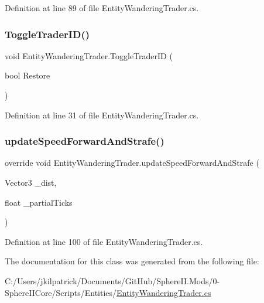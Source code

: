 Definition at line 89 of file Entity\+Wandering\+Trader.\+cs.

\mbox{\label{class_entity_wandering_trader_a69dd924900c7fbd29d0d8d60eb3fef84}} 
\subsubsection{\texorpdfstring{ToggleTraderID()}{ToggleTraderID()}}
{\footnotesize\ttfamily void Entity\+Wandering\+Trader.\+Toggle\+Trader\+ID (\begin{DoxyParamCaption}\item[{bool}]{Restore }\end{DoxyParamCaption})}



Definition at line 31 of file Entity\+Wandering\+Trader.\+cs.

\mbox{\label{class_entity_wandering_trader_a52a62140eb8466285b6305988c51066e}} 
\subsubsection{\texorpdfstring{updateSpeedForwardAndStrafe()}{updateSpeedForwardAndStrafe()}}
{\footnotesize\ttfamily override void Entity\+Wandering\+Trader.\+update\+Speed\+Forward\+And\+Strafe (\begin{DoxyParamCaption}\item[{Vector3}]{\+\_\+dist,  }\item[{float}]{\+\_\+partial\+Ticks }\end{DoxyParamCaption})\hspace{0.3cm}{\ttfamily [protected]}}



Definition at line 100 of file Entity\+Wandering\+Trader.\+cs.



The documentation for this class was generated from the following file\+:\begin{DoxyCompactItemize}
\item 
C\+:/\+Users/jkilpatrick/\+Documents/\+Git\+Hub/\+Sphere\+I\+I.\+Mods/0-\/\+Sphere\+I\+I\+Core/\+Scripts/\+Entities/\mbox{\hyperlink{_entity_wandering_trader_8cs}{Entity\+Wandering\+Trader.\+cs}}\end{DoxyCompactItemize}
